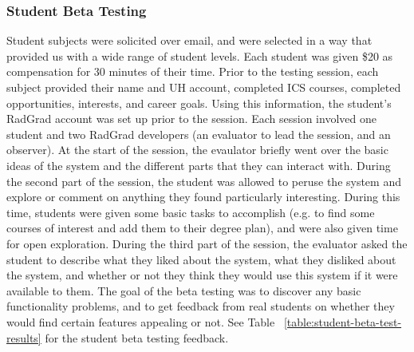 \subsubsection{Student Beta Testing}

Student subjects were solicited over email, and were selected in a way that provided us with a wide range of student levels. Each student was given \$20 as compensation for 30 minutes of their time. Prior to the testing session, each subject provided their name and UH account, completed ICS courses, completed opportunities, interests, and career goals. Using this information, the student's RadGrad account was set up prior to the session. Each session involved one student and two RadGrad developers (an evaluator to lead the session, and an observer). At the start of the session, the evaulator briefly went over the basic ideas of the system and the different parts that they can interact with. During the second part of the session, the student was allowed to peruse the system and explore or comment on anything they found particularly interesting. During this time, students were given some basic tasks to accomplish (e.g. to find some courses of interest and add them to their degree plan), and were also given time for open exploration. During the third part of the session, the evaluator asked the student to describe what they liked about the system, what they disliked about the system, and whether or not they think they would use this system if it were available to them. The goal of the beta testing was to discover any basic functionality problems, and to get feedback from real students on whether they would find certain features appealing or not. See Table ~\ref{table:student-beta-test-results} for the student beta testing feedback.

